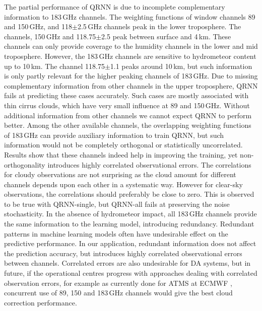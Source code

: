 \documentclass[amt, manuscript]{copernicus}
\begin{document}
The partial performance of QRNN is due to incomplete complementary information to 183\,GHz channels. The weighting functions of window channels 89 and 150\,GHz, and 118$\pm$2.5\,GHz channels peak in the lower troposphere. The channels, 150\,GHz and 118.75$\pm$2.5 peak between surface and 4\,km. These channels can only provide coverage to the humidity channels in the lower and mid troposphere. However, the 183\,GHz channels are sensitive to hydrometeor content up to 10\,km. The channel 118.75$\pm$1.1 peaks around 10\,km, but such information is only partly relevant for the higher peaking channels of 183\,GHz. Due to missing complementary information from other channels in the upper troposphere, QRNN fails at predicting these cases accurately. Such cases are mostly associated with thin cirrus clouds, which have very small influence at 89 and 150\,GHz. Without additional information from other channels we cannot expect QRNN to perform better. Among the other available channels, the overlapping weighting functions of 183\,GHz can provide auxiliary information to train QRNN, but such information would not be completely orthogonal or statistically uncorrelated. Results show that these channels indeed help in improving the training, yet non-orthogonality introduces highly correlated observational errors. The correlations for cloudy observations are not surprising as the cloud amount for different channels depends upon each other in a systematic way. However for clear-sky observations, the correlations should preferably be close to zero. This is observed to be true with QRNN-single, but QRNN-all fails at preserving the noise stochasticity. In the absence of hydrometeor impact, all 183\,GHz channels provide the same information to the learning model, introducing redundancy. Redundant patterns in machine learning models often have undesirable effect on the predictive performance. In our application, redundant information does not affect the prediction accuracy, but introduces highly correlated observational errors between channels. Correlated errors are also undesirable for DA systems, but in future, if the operational centres progress with approaches dealing with correlated observation errors, for example as currently done for ATMS at ECMWF \citep{Weston2018eumATMS}, concurrent use of 89, 150 and 183\,GHz channels would give the best cloud correction performance.
\end{document}
